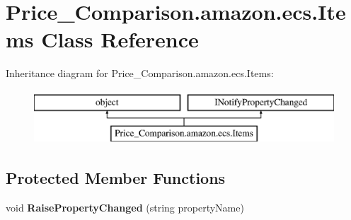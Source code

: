 \hypertarget{class_price___comparison_1_1amazon_1_1ecs_1_1_items}{\section{Price\-\_\-\-Comparison.\-amazon.\-ecs.\-Items Class Reference}
\label{class_price___comparison_1_1amazon_1_1ecs_1_1_items}
}


 


Inheritance diagram for Price\-\_\-\-Comparison.\-amazon.\-ecs.\-Items\-:\begin{figure}[H]
\begin{center}
\leavevmode
\includegraphics[height=2.000000cm]{class_price___comparison_1_1amazon_1_1ecs_1_1_items}
\end{center}
\end{figure}
\subsection*{Protected Member Functions}
\begin{DoxyCompactItemize}
\item 
\hypertarget{class_price___comparison_1_1amazon_1_1ecs_1_1_items_ad1667c20f3630a546ace59c10dbbfc1e}{void {\bfseries Raise\-Property\-Changed} (string property\-Name)}\label{class_price___comparison_1_1amazon_1_1ecs_1_1_items_ad1667c20f3630a546ace59c10dbbfc1e}

\end{DoxyCompactItemize}

